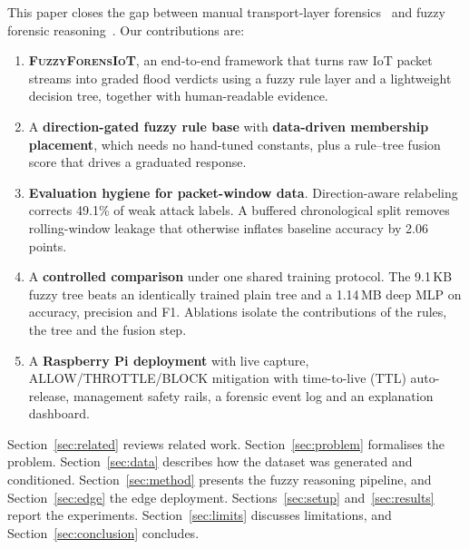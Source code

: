 \documentclass[conference]{IEEEtran}
\newcommand{\fname}{\textsc{FuzzyForensIoT}}
\begin{document}
This paper closes the gap between manual transport-layer forensics~\cite{naing2023,khaing2020} and fuzzy forensic reasoning~\cite{ye2022}. Our contributions are:
\begin{enumerate}
  \item \textbf{\fname{}}, an end-to-end framework that turns raw IoT packet streams into graded flood verdicts using a fuzzy rule layer and a lightweight decision tree, together with human-readable evidence.
  \item A \textbf{direction-gated fuzzy rule base} with \textbf{data-driven membership placement}, which needs no hand-tuned constants, plus a rule--tree fusion score that drives a graduated response.
  \item \textbf{Evaluation hygiene for packet-window data}. Direction-aware relabeling corrects 49.1\% of weak attack labels. A buffered chronological split removes rolling-window leakage that otherwise inflates baseline accuracy by 2.06 points.
  \item A \textbf{controlled comparison} under one shared training protocol. The 9.1\,KB fuzzy tree beats an identically trained plain tree and a 1.14\,MB deep MLP on accuracy, precision and F1. Ablations isolate the contributions of the rules, the tree and the fusion step.
  \item A \textbf{Raspberry Pi deployment} with live capture, ALLOW/THROTTLE/BLOCK mitigation with time-to-live (TTL) auto-release, management safety rails, a forensic event log and an explanation dashboard.
\end{enumerate}

Section~\ref{sec:related} reviews related work. Section~\ref{sec:problem} formalises the problem. Section~\ref{sec:data} describes how the dataset was generated and conditioned. Section~\ref{sec:method} presents the fuzzy reasoning pipeline, and Section~\ref{sec:edge} the edge deployment. Sections~\ref{sec:setup} and~\ref{sec:results} report the experiments. Section~\ref{sec:limits} discusses limitations, and Section~\ref{sec:conclusion} concludes.
\end{document}
